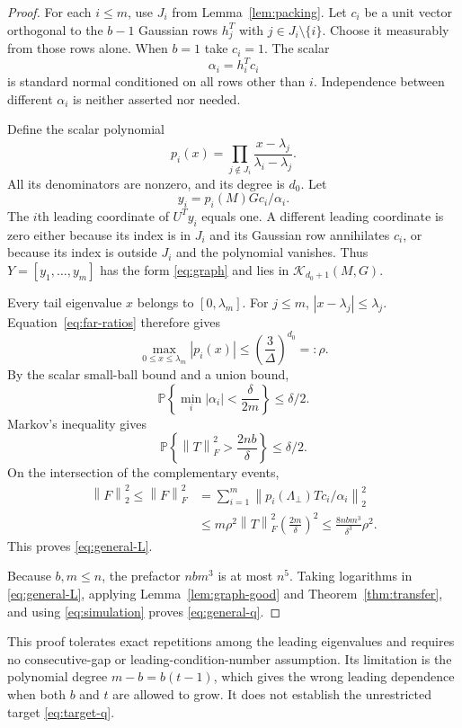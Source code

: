 \documentclass[11pt]{article}
\theoremstyle{definition}
\newcommand{\Prob}{\mathbb P}
\newcommand{\K}{\mathcal K}
\newcommand{\norm}[1]{\left\lVert #1\right\rVert}
\begin{document}
\begin{proof}
For each $i\leq m$, use $J_i$ from Lemma~\ref{lem:packing}. Let $c_i$ be a
unit vector orthogonal to the $b-1$ Gaussian rows $h_j^T$ with
$j\in J_i\setminus\{i\}$. Choose it measurably from those rows alone.
When $b=1$ take $c_i=1$. The scalar
\[
 \alpha_i=h_i^Tc_i
\]
is standard normal conditioned on all rows other than $i$. Independence
between different $\alpha_i$ is neither asserted nor needed.

Define the scalar polynomial
\begin{equation}
 p_i(x)=\prod_{j\notin J_i}
              \frac{x-\lambda_j}{\lambda_i-\lambda_j}.
 \label{eq:scalar-filter}
\end{equation}
All its denominators are nonzero, and its degree is $d_0$. Let
\[
 y_i=p_i(M)Gc_i/\alpha_i.
\]
The $i$th leading coordinate of $U^Ty_i$ equals one. A different leading
coordinate is zero either because its index is in $J_i$ and its Gaussian
row annihilates $c_i$, or because its index is outside $J_i$ and the
polynomial vanishes. Thus $Y=[y_1,\ldots,y_m]$ has the form
\eqref{eq:graph} and lies in $\K_{d_0+1}(M,G)$.

Every tail eigenvalue $x$ belongs to $[0,\lambda_m]$. For $j\leq m$,
$|x-\lambda_j|\leq\lambda_j$. Equation~\eqref{eq:far-ratios} therefore gives
\begin{equation}
 \max_{0\leq x\leq\lambda_m}|p_i(x)|
 \leq \left(\frac3\Delta\right)^{d_0}=:\rho.
 \label{eq:scalar-tail-bound}
\end{equation}
By the scalar small-ball bound and a union bound,
\[
 \Prob\left\{\min_i|\alpha_i|<\frac{\delta}{2m}\right\}\leq\delta/2.
\]
Markov's inequality gives
\[
 \Prob\left\{\norm{T}_F^2>\frac{2nb}{\delta}\right\}\leq\delta/2.
\]
On the intersection of the complementary events,
\begin{align*}
 \norm{F}_2^2\leq\norm{F}_F^2
 &=\sum_{i=1}^m
    \norm{p_i(\Lambda_\perp)Tc_i/\alpha_i}_2^2\\
 &\leq m\rho^2\norm{T}_F^2\left(\frac{2m}{\delta}\right)^2
 \leq\frac{8nbm^3}{\delta^3}\rho^2.
\end{align*}
This proves \eqref{eq:general-L}.

Because $b,m\leq n$, the prefactor $nbm^3$ is at most $n^5$. Taking
logarithms in \eqref{eq:general-L}, applying
Lemma~\ref{lem:graph-good} and Theorem~\ref{thm:transfer}, and using
\eqref{eq:simulation} proves \eqref{eq:general-q}.
\end{proof}

This proof tolerates exact repetitions among the leading eigenvalues and
requires no consecutive-gap or leading-condition-number assumption.
Its limitation is the polynomial degree $m-b=b(t-1)$, which gives the wrong
leading dependence when both $b$ and $t$ are allowed to grow. It does not
establish the unrestricted target \eqref{eq:target-q}.
\end{document}
